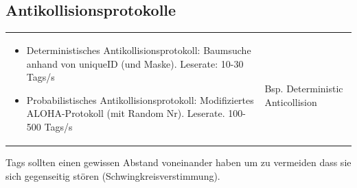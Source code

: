 \subsection{Antikollisionsprotokolle}
	\begin{tabular}{ll}
		\parbox{9cm}{
			\begin{itemize}
				 \item Deterministisches Antikollisionsprotokoll: Baumsuche anhand von uniqueID (und Maske). Leserate: 10-30 Tags/s
				 
				 \item Probabilistisches Antikollisionsprotokoll: Modifiziertes ALOHA-Protokoll (mit Random Nr). Leserate. 100-500 Tags/s
			\end{itemize}
		}	
		& \parbox{9cm}{
			\\ Bsp. Deterministic Anticollision
		}
	\end{tabular}
	
	Tags sollten einen gewissen Abstand voneinander haben um zu vermeiden dass sie sich gegenseitig stören (Schwingkreisverstimmung).

